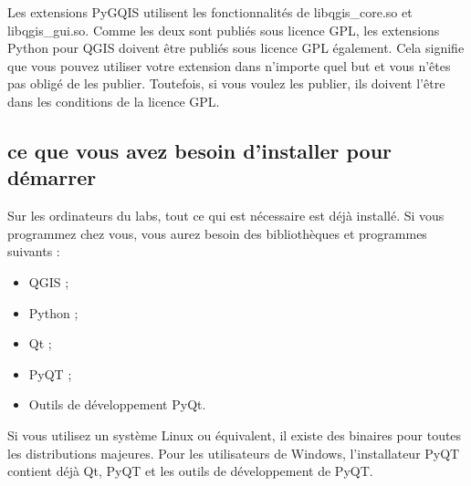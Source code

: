 Les extensions PyGQIS utilisent les fonctionnalités de libqgis\_core.so et
libqgis\_gui.so. Comme les deux sont publiés sous licence GPL, les extensions
Python pour QGIS doivent être publiés sous licence GPL également. Cela signifie
que vous pouvez utiliser votre extension dans n'importe quel but et vous n'êtes pas
obligé de les publier. Toutefois, si vous voulez les publier, ils doivent l'être
dans les conditions de la licence GPL.

\subsection{ce que vous avez besoin d'installer pour démarrer}

Sur les ordinateurs du labs, tout ce qui est nécessaire est déjà installé. Si
vous programmez chez vous, vous aurez besoin des bibliothèques et programmes
suivants :

\begin{itemize}
\item QGIS ;
\item Python ;
\item Qt ;
\item PyQT ;
\item Outils de développement PyQt.
\end{itemize}

Si vous utilisez un système Linux ou équivalent, il existe des binaires pour
toutes les distributions majeures. Pour les utilisateurs de Windows,
l'installateur PyQT contient déjà Qt, PyQT et les outils de développement de
PyQT.

